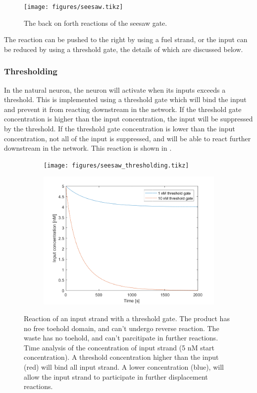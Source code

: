 \begin{figure}[h]
\texttt{[image: figures/seesaw.tikz]}
\caption{The back on forth reactions of the seesaw gate.}
\label{seesaw}
\end{figure}

The reaction can be pushed to the right by using a fuel strand, or the input can be reduced by using a threshold gate, the details of which are discussed below.

\subsubsection{Thresholding}
In the natural neuron, the neuron will activate when its inputs exceeds a threshold. This is implemented using a threshold gate which will bind the input and prevent it from reacting downstream in the network. If the threshold gate concentration is higher than the input concentration, the input will be suppressed by the threshold. If the threshold gate concentration is lower than the input concentration, not all of the input is suppressed, and will be able to react further downstream in the network. This reaction is shown in .

\begin{figure}[h]
  \begin{subfigure}[t]{.49\textwidth}
    \texttt{[image: figures/seesaw\_thresholding.tikz]}
\caption{}
\label{seesaw_thresholding_reaction}
\end{subfigure}
\hfill
\begin{subfigure}[t]{.49\columnwidth}
  \centering
\includegraphics[width=\linewidth]{images/thresholding.png}
\caption{}
\label{seesaw_thresholding_analysis}
\end{subfigure}
\caption{ Reaction of an input strand with a threshold gate. The product has no free toehold domain, and can't undergo reverse reaction. The waste has no toehold, and can't parcitipate in further reactions.  Time analysis of the concentration of input strand (5 nM start concentration). A threshold concentration higher than the input (red) will bind all input strand. A lower concentration (blue), will allow the input strand to participate in further displacement reactions.}
\end{figure}

